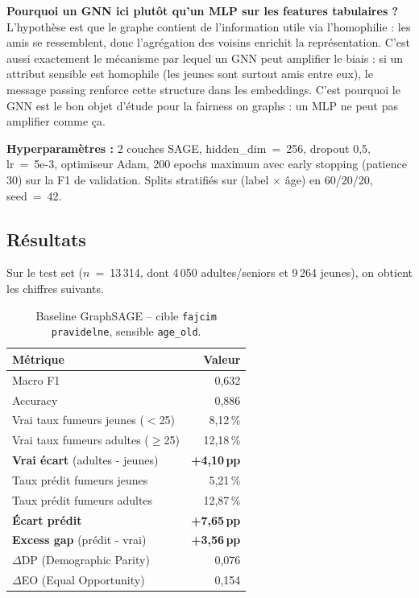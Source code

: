 \documentclass[10pt,a4paper,twocolumn]{article}
\begin{document}
\textbf{Pourquoi un GNN ici plutôt qu'un MLP sur les features tabulaires ?} L'hypothèse est que le graphe contient de l'information utile via l'homophilie : les amis se ressemblent, donc l'agrégation des voisins enrichit la représentation. C'est aussi exactement le mécanisme par lequel un GNN peut amplifier le biais : si un attribut sensible est homophile (les jeunes sont surtout amis entre eux), le message passing renforce cette structure dans les embeddings. C'est pourquoi le GNN est le bon objet d'étude pour la fairness on graphs : un MLP ne peut pas amplifier comme ça.

\textbf{Hyperparamètres :} 2 couches SAGE, hidden\_dim~=~256, dropout 0{,}5, lr~=~5e-3, optimiseur Adam, 200 epochs maximum avec early stopping (patience 30) sur la F1 de validation. Splits stratifiés sur (label $\times$ âge) en 60/20/20, seed~=~42.

\subsection{Résultats}

Sur le test set ($n$~=~13\,314, dont 4\,050 adultes/seniors et 9\,264 jeunes), on obtient les chiffres suivants.

\begin{table}[H]
\centering
\footnotesize
\begin{tabular}{lr}
\toprule
Métrique & Valeur \\
\midrule
Macro F1 & 0{,}632 \\
Accuracy & 0{,}886 \\
Vrai taux fumeurs jeunes ($<$25) & 8{,}12\,\% \\
Vrai taux fumeurs adultes ($\geq$25) & 12{,}18\,\% \\
\textbf{Vrai écart} (adultes - jeunes) & \textbf{+4{,}10\,pp} \\
Taux prédit fumeurs jeunes & 5{,}21\,\% \\
Taux prédit fumeurs adultes & 12{,}87\,\% \\
\textbf{Écart prédit} & \textbf{+7{,}65\,pp} \\
\textbf{Excess gap} (prédit - vrai) & \textbf{+3{,}56\,pp} \\
$\Delta$DP (Demographic Parity) & 0{,}076 \\
$\Delta$EO (Equal Opportunity) & 0{,}154 \\
\bottomrule
\end{tabular}
\caption{Baseline GraphSAGE -- cible \texttt{fajcim pravidelne}, sensible \texttt{age\_old}.}
\end{table}
\end{document}
